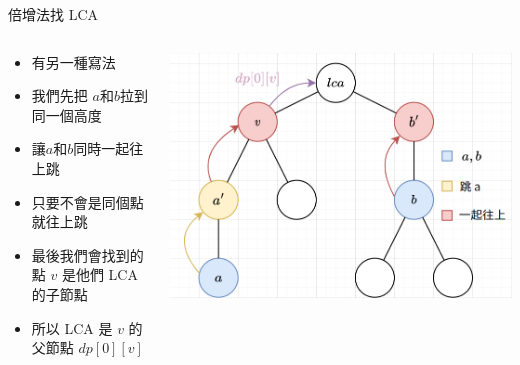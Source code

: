 \documentclass[aspectratio=169]{beamer}
\begin{document}
    \begin{frame}{倍增法找 LCA}
        \begin{columns}
            \begin{column}{0.65 \textwidth}
                \begin{itemize}
                    \item 有另一種寫法
                    \item<2-> 我們先把 $a$和$b$拉到同一個高度
                    \item<2-> 讓$a$和$b$同時一起往上跳
                    \item<2-> 只要不會是同個點就往上跳
                    \item<3-> 最後我們會找到的點 $v$ 是他們 LCA 的子節點
                    \item<3-> 所以 LCA 是 $v$ 的父節點 $dp[0][v]$
                \end{itemize}
            \end{column}
            \begin{column}{0.4 \textwidth}
                \begin{center}
                    \includegraphics[scale=0.3]{images/binary_lifting_lca_2.png}
                \end{center}
            \end{column}
        \end{columns}
    \end{frame}
    
\end{document}
